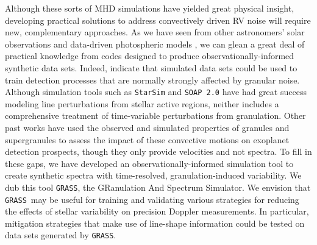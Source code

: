 \documentclass[twocolumn]{aastex63}
\newcommand{\ms}{{\rm m\ s}^{-1}}
\newcommand{\grass}{\texttt{GRASS}}
\newcommand{\revise}[1]{#1}
\begin{document}
% 

\begin{figure*}[htb!]
\caption{Temporal and spatial variability in input bisectors encode turbulent granulation velocities. \textbf{Left:} To capture the line-of-sight variation observed in solar bisectors, observations were carried out at many discrete disk positions along each of the four solar limbs plus disk center. Figure adapted from Figure 1 of . \textbf{Right:} Line bisectors differ in shape with both time and apparent position on the solar disk. From disk center ($\mu = 1$) to the limb ($\mu = 0$), bisectors transition from a distorted ``C"-shape to something more resembling a ``\textbackslash"-shape. This behavior results from the different viewing angles of convective granules along different lines of sight \citep[Figure 17.13 of ][]{Gray2008}. The solid, \revise{dashed, and dotted} lines trace the time-averaged bisector for each limb position. The shaded regions correspond to the $\pm1\sigma$ temporal variability of the bisectors at each limb position. Error bars in velocity are not shown; with an absolute wavelength calibration accuracy on order $\sim$$0.02$ m\AA\ ($\sim$1 $\ms$), the observed temporal variations are much larger than the typical uncertainty. \label{fig:one}}
\end{figure*}

Although these sorts of MHD simulations have yielded great physical insight, developing practical solutions to address convectively driven RV noise will require \revise{new, complementary} approaches. As we have seen from other astronomers' solar observations and data-driven photospheric models \citep[e.g.,][]{Dumusque2014, Haywood2016}, we can glean a great deal of practical knowledge from codes designed to produce observationally-informed synthetic data sets. \revise{Indeed, \citet{Sulis2017} indicate that simulated data sets could be used to train detection processes that are normally strongly affected by granular noise.} Although \revise{simulation tools such as} \texttt{StarSim} and \texttt{SOAP 2.0} have had great success modeling line perturbations from stellar active regions, neither includes a comprehensive treatment of time-variable perturbations from granulation. \revise{Other past works have used the observed and simulated properties of granules \citep{Meunier2015} and supergranules \citep{Meunier2019, Meunier2020a} to assess the impact of these convective motions on exoplanet detection prospects, though they only provide velocities and not spectra.} To fill in \revise{these gaps,} we have developed an observationally-informed simulation tool to create synthetic spectra with time-resolved, granulation-induced variability. We dub this tool \texttt{GRASS}, the GRanulation And Spectrum Simulator. \revise{We envision that \grass\ may be useful for training and validating various strategies for reducing the effects of stellar variability on precision Doppler measurements. In particular, mitigation strategies that make use of line-shape information could be tested on data sets generated by \grass. } \par 
\end{document}
